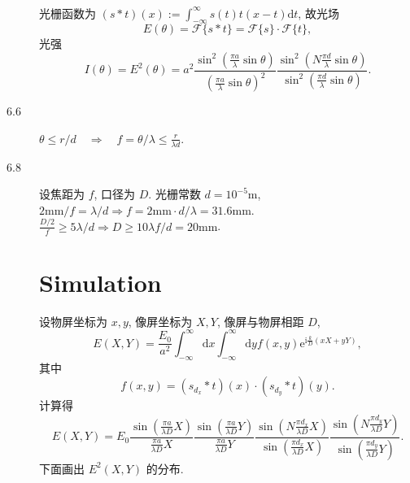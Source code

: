 \documentclass[11pt, twoside]{article}   	%
\theoremstyle{plain}
\theoremstyle{definition}
\begin{document}
\begin{description}
\begin{align}
			\end{align}
			光栅函数为 $(s * t)(x) := \int_{-\infty}^{\infty} s(t) t(x - t) \mathrm{d}t$, 故光场
			\begin{equation}
				E(\theta) = \mathcal F\{s * t\} = \mathcal F\{s\} \cdot \mathcal F\{t\},
			\end{equation}
			光强
			\begin{equation}
				I(\theta) = E^2(\theta) = a^2 \frac{\sin^2 \left( \frac{\pi a}{\lambda} \sin\theta \right)}{\left( \frac{\pi a}{\lambda} \sin\theta \right)^2} \frac{\sin^2 \left( N \frac{\pi d}{\lambda} \sin\theta \right)}{\sin^2 \left( \frac{\pi d}{\lambda} \sin\theta \right)}.
			\end{equation}
		\item[6.6] $\theta \leq r / d \quad \Rightarrow \quad f = \theta / \lambda \leq \frac{r}{\lambda d}$.
		\item[6.8] 设焦距为 $f$, 口径为 $D$. 光栅常数 $d = 10^{-5} \mathrm{m}$, $2 \mathrm{mm} / f = \lambda / d \Rightarrow f = 2 \mathrm{mm} \cdot d / \lambda = 31.6 \mathrm{mm}$. $\frac{D/2}{f} \geq 5\lambda / d \Rightarrow D \geq 10 \lambda f / d = 20 \mathrm{mm}$.

			\section{Simulation}
			设物屏坐标为 $x, y$, 像屏坐标为 $X, Y$, 像屏与物屏相距 $D$,
			\begin{equation}
				E(X, Y) = \frac{E_0}{a^2} \int_{-\infty}^{\infty} \mathrm{d}x \int_{-\infty}^{\infty} \mathrm{d}y f(x, y) \mathrm e^{\mathrm{i}\frac{k}{D} (xX + yY)},
			\end{equation}
			其中
			\begin{equation}
				f(x, y) = (s_{d_x} * t)(x) \cdot (s_{d_y} * t)(y).
			\end{equation}
			计算得
			\begin{equation}
				E(X, Y) = E_0 \frac{\sin \left( \frac{\pi a}{\lambda D} X \right)}{\frac{\pi a}{\lambda D} X} \frac{\sin \left( \frac{\pi a}{\lambda D} Y \right)}{\frac{\pi a}{\lambda D} Y} \frac{\sin \left( N \frac{\pi d_x}{\lambda D} X \right)}{\sin \left( \frac{\pi d_x}{\lambda D} X \right)} \frac{\sin \left( N \frac{\pi d_y}{\lambda D} Y \right)}{\sin \left( \frac{\pi d_y}{\lambda D} Y \right)}.
			\end{equation}
			下面画出 $E^2(X, Y)$ 的分布.


\end{description}
\end{document}
